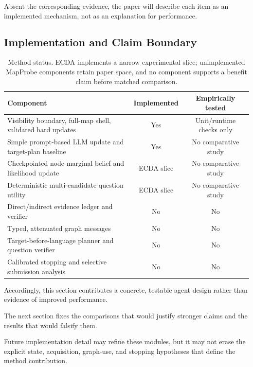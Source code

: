 Absent the corresponding evidence, the paper will describe each item as an implemented mechanism, not
as an explanation for performance.

\subsection{Implementation and Claim Boundary}

\begin{table}[t]
\caption{Method status. ECDA implements a narrow experimental slice; unimplemented MapProbe
components retain paper space, and no component supports a benefit claim before matched comparison.}
\label{tab:agent-status}
\centering
\small
\begin{tabularx}{\linewidth}{>{\raggedright\arraybackslash}Xcc}
\toprule
\textbf{Component} & \textbf{Implemented} & \textbf{Empirically tested} \\
\midrule
Visibility boundary, full-map shell, validated hard updates & Yes & Unit/runtime checks only \\
Simple prompt-based LLM update and target-plan baseline & Yes & No comparative study \\
Checkpointed node-marginal belief and likelihood update & ECDA slice & No comparative study \\
Deterministic multi-candidate question utility & ECDA slice & No comparative study \\
Direct/indirect evidence ledger and verifier & No & No \\
Typed, attenuated graph messages & No & No \\
Target-before-language planner and question verifier & No & No \\
Calibrated stopping and selective submission analysis & No & No \\
\bottomrule
\end{tabularx}
\end{table}

Accordingly, this section contributes a concrete, testable agent design rather than evidence of improved
performance.

The next section fixes the comparisons that would justify stronger claims and the results that would
falsify them.

Future implementation detail may refine these modules, but it may not erase the explicit state,
acquisition, graph-use, and stopping hypotheses that define the method contribution.
